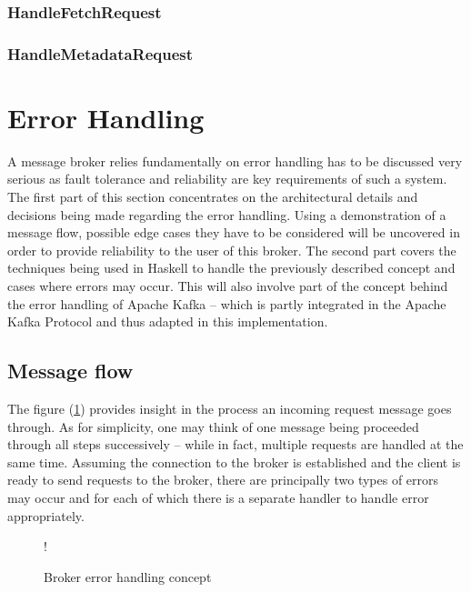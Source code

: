\subsubsection{HandleFetchRequest}

\subsubsection{HandleMetadataRequest}

\section{Error Handling}
\label{sec:broker-error-handling}

A message broker relies fundamentally on error handling has to be discussed very
serious as fault tolerance and reliability are key requirements  of such a system. The first part of this
section concentrates on the architectural details and decisions being made
regarding the error handling. Using a demonstration of a message flow, possible
edge cases they have to be considered will be uncovered in order to provide
reliability to the user of this broker. The second part covers the techniques
being used in Haskell to handle the previously described concept and cases where
errors may occur. This will also involve part of the concept behind the error
handling of Apache Kafka -- which is partly integrated in the Apache Kafka
Protocol and thus adapted in this implementation.

\subsection{Message flow}

The figure (\ref{fig:broker-error-activity}) provides insight in the process an
incoming request message goes through. As for simplicity, one may think of one
message being proceeded through all steps successively -- while in fact,
multiple requests are handled at the same time. Assuming the connection to the
broker is established and the client is ready to send requests to the broker,
there are principally two types of errors may occur and for each of which there
is a separate handler to handle error appropriately.

\begin{figure}[H]
  \centering
   {!} {
    
  }
  \caption{Broker error handling concept}
  \label{fig:broker-error-activity}
\end{figure}


